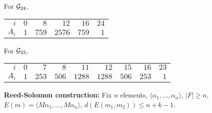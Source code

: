 For ${\cal G}_{24}$,
\begin{center}
\begin{tabular} {|r|r|r|r|r|r|}
\hline
$i$ & $0$ & $8$ & $12$ & $16$ & $24$ \\
$A_i$ & $1$ & $759$ & $2576$ & $759$ & $1$ \\
\hline
\end{tabular}
\end{center}
For ${\cal G}_{23}$,
\begin{center}
\begin{tabular} {|r|r|r|r|r|r|r|r|r|}
\hline
$i$ & $0$ & $7$ & $8$ & $11$ & $12$ & $15$ & $16$ & $23$ \\
$A_i$ & $1$ & $253$ & $506$ & $1288$ & $1288$ & $506$ & $253$ & $1$ \\
\hline
\end{tabular}
\end{center}
{\bf Reed-Solomon construction:} 
Fix $n$ elements, $\langle \alpha_1 , ..., \alpha_n \rangle$, 
$|F| \geq n$, $E(m)= \langle M\alpha_1 , ..., M\alpha_n \rangle$, $d(E(m_1,m_2)) \leq n+k-1$.

